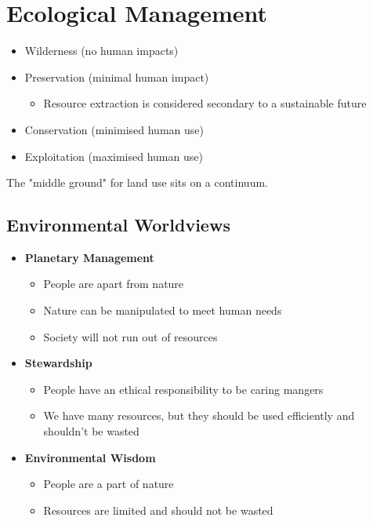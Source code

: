 \section{Ecological Management} \label{26/05/2025}

	\begin{itemize}
		\item Wilderness (no human impacts)
		\item Preservation (minimal human impact)
			\begin{itemize}
				\item Resource extraction is considered secondary to a sustainable future
			\end{itemize}
		\item Conservation (minimised human use)
		\item Exploitation (maximised human use)
	\end{itemize}

	The "middle ground" for land use sits on a continuum.

	\subsection{Environmental Worldviews}
		
		\begin{itemize}
			\item \textbf{Planetary Management}
				\begin{itemize}
					\item People are apart from nature
					\item Nature can be manipulated to meet human needs
					\item Society will not run out of resources
				\end{itemize}

			\item \textbf{Stewardship}
				\begin{itemize}
					\item People have an ethical responsibility to be caring mangers
					\item We have many resources, but they should be used efficiently and shouldn't be wasted
				\end{itemize}

			\item \textbf{Environmental Wisdom}
				\begin{itemize}
					\item People are a part of nature
					\item Resources are limited and should not be wasted
				\end{itemize}
		\end{itemize}

